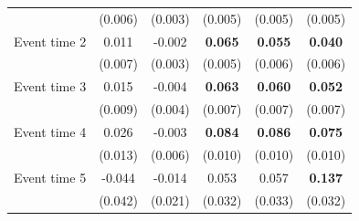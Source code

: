 \begin{table}[htbp]
{{\begin{tabular}{lccccc}
       & (0.006) & (0.003) & (0.005) & (0.005) & (0.005)\\
      Event time 2 & 0.011 & -0.002 & \textbf{0.065} & \textbf{0.055} & \textbf{0.040}\\
       & (0.007) & (0.003) & (0.005) & (0.006) & (0.006)\\
      Event time 3 & 0.015 & -0.004 & \textbf{0.063} & \textbf{0.060} & \textbf{0.052}\\
       & (0.009) & (0.004) & (0.007) & (0.007) & (0.007)\\
      Event time 4 & 0.026 & -0.003 & \textbf{0.084} & \textbf{0.086} & \textbf{0.075}\\
       & (0.013) & (0.006) & (0.010) & (0.010) & (0.010)\\
      Event time 5 & -0.044 & -0.014 & 0.053 & 0.057 & \textbf{0.137}\\
       & (0.042) & (0.021) & (0.032) & (0.033) & (0.032)\\
      \bottomrule
   \end{tabular}   
   }}

\end{table}